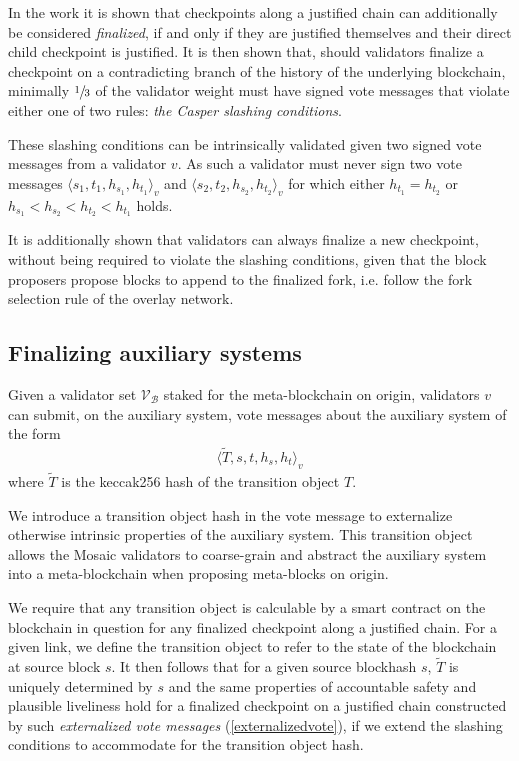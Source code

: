 \documentclass[12pt,a4paper]{article}
\begin{document}
In the work it is shown that checkpoints along a justified chain can additionally be considered \emph{finalized}, if and only if they are justified themselves and their direct child checkpoint is justified.
It is then shown that, should validators finalize a checkpoint on a contradicting branch of the history of the underlying blockchain, minimally $\sfrac{1}{3}$ of the validator weight must have signed vote messages that violate either one of two rules: \emph{the Casper slashing conditions}.

These slashing conditions can be intrinsically validated given two signed vote messages from a validator $v$.
As such a validator must never sign two vote messages $\langle s_1, t_1, h_{s_1}, h_{t_1}\rangle_v$ and $\langle s_2, t_2, h_{s_2}, h_{t_2}\rangle_v$ for which either $h_{t_1} = h_{t_2}$ or $h_{s_1} < h_{s_2} < h_{t_2} < h_{t_1}$ holds.

It is additionally shown that validators can always finalize a new checkpoint, without being required to violate the slashing conditions, given that the block proposers propose blocks to append to the finalized fork, i.e. follow the fork selection rule of the overlay network.

\subsection{Finalizing auxiliary systems}
Given a validator set $\mathcal{V}_\mathcal{B}$ staked for the meta-blockchain on origin, validators $v$ can submit, on the auxiliary system, vote messages about the auxiliary system of the form
\begin{align}\label{externalizedvote}
  \langle \tilde{T}, s, t, h_s, h_t \rangle_v
\end{align}
where $\tilde{T}$ is the keccak256 hash of the transition object $T$.

We introduce a transition object hash in the vote message to externalize otherwise intrinsic properties of the auxiliary system.
This transition object allows the Mosaic validators to coarse-grain and abstract the auxiliary system into a meta-blockchain when proposing meta-blocks on origin.

We require that any transition object is calculable by a smart contract on the blockchain in question for any finalized checkpoint along a justified chain.
For a given link, we define the transition object to refer to the state of the blockchain at source block $s$. %
It then follows that for a given source blockhash $s$, $\tilde{T}$ is uniquely determined by $s$ and the same properties of accountable safety and plausible liveliness hold for a finalized checkpoint on a justified chain constructed by such \emph{externalized vote messages} (\ref{externalizedvote}), if we extend the slashing conditions to accommodate for the transition object hash.
\end{document}

